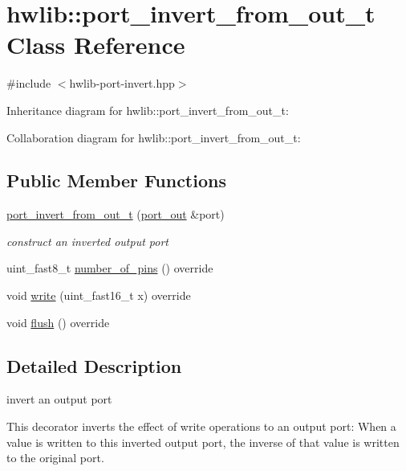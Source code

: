 \hypertarget{classhwlib_1_1port__invert__from__out__t}{}\section{hwlib\+:\+:port\+\_\+invert\+\_\+from\+\_\+out\+\_\+t Class Reference}
\label{classhwlib_1_1port__invert__from__out__t}


{\ttfamily \#include $<$hwlib-\/port-\/invert.\+hpp$>$}



Inheritance diagram for hwlib\+:\+:port\+\_\+invert\+\_\+from\+\_\+out\+\_\+t\+:


Collaboration diagram for hwlib\+:\+:port\+\_\+invert\+\_\+from\+\_\+out\+\_\+t\+:
\subsection*{Public Member Functions}
\begin{DoxyCompactItemize}
\item 
\hyperlink{classhwlib_1_1port__invert__from__out__t_a2f59faac86c4fc1eb2eeeccc8aff4657}{port\+\_\+invert\+\_\+from\+\_\+out\+\_\+t} (\hyperlink{classhwlib_1_1port__out}{port\+\_\+out} \&port)
\begin{DoxyCompactList}\small\item\em construct an inverted output port \end{DoxyCompactList}\item 
uint\+\_\+fast8\+\_\+t \hyperlink{classhwlib_1_1port__invert__from__out__t_af0b7be0e09f227190f2cee9c6f43120d}{number\+\_\+of\+\_\+pins} () override
\item 
void \hyperlink{classhwlib_1_1port__invert__from__out__t_aaa8d6d9bb1d98cd3526d3eb6a91f34d9}{write} (uint\+\_\+fast16\+\_\+t x) override
\item 
void \hyperlink{classhwlib_1_1port__invert__from__out__t_ad0a8249cec2ce5698ea3a41b19240ed5}{flush} () override
\end{DoxyCompactItemize}


\subsection{Detailed Description}
invert an output port

This decorator inverts the effect of write operations to an output port\+: When a value is written to this inverted output port, the inverse of that value is written to the original port. 

